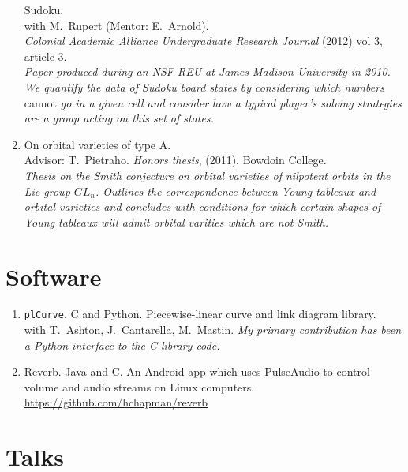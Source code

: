 \documentclass[letterpaper]{article}
\begin{document}
\begin{enumerate}
  Sudoku.\\
  with M.\ Rupert (Mentor: E.\ Arnold). \\
  \textit{Colonial Academic
    Alliance
    Undergraduate Research Journal} (2012) vol 3, article 3.\\
  \textit{Paper produced during an NSF REU at James Madison University
    in 2010. We quantify the data of Sudoku board states by
    considering which numbers} cannot \textit{go in a given cell and
    consider how a typical player's solving strategies are a group
    acting on this set of states.}
\item On orbital varieties of type A. \\
  Advisor: T.\ Pietraho. \textit{Honors thesis}, (2011). Bowdoin
  College.\\
  \textit{Thesis on the Smith conjecture on orbital varieties of
    nilpotent orbits in the Lie group $GL_n$.  Outlines the
    correspondence between Young tableaux and orbital varieties and
    concludes with conditions for which certain shapes of Young
    tableaux will admit orbital varities which are not Smith.}
\end{enumerate}

\section*{Software}

\begin{enumerate}
\item \texttt{plCurve}. C and Python. Piecewise-linear curve and link diagram library.\\
  with T.\ Ashton, J.\ Cantarella, M.\ Mastin.
  \textit{My primary contribution has been a Python interface to the C
  library code.}
\item Reverb. Java and C. An Android app which uses PulseAudio to
  control volume and audio streams on Linux computers. \\
  \url{https://github.com/hchapman/reverb}
\end{enumerate}

\section*{Talks}
\end{document}
